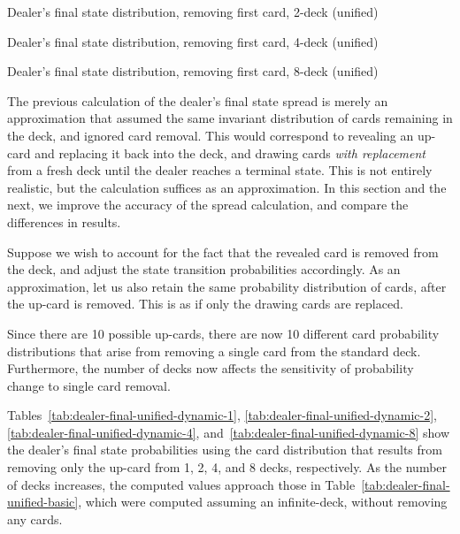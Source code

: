 \begin{table}[ht!]
\caption{Dealer's final state distribution, removing first card, 2-deck (unified)}
\begin{center}

\end{center}
\label{tab:dealer-final-unified-dynamic-2}
\end{table}

\begin{table}[ht!]
\caption{Dealer's final state distribution, removing first card, 4-deck (unified)}
\begin{center}

\end{center}
\label{tab:dealer-final-unified-dynamic-4}
\end{table}

\begin{table}[ht!]
\caption{Dealer's final state distribution, removing first card, 8-deck (unified)}
\begin{center}

\end{center}
\label{tab:dealer-final-unified-dynamic-8}
\end{table}

The previous calculation of the dealer's final state spread
is merely an approximation that assumed the same invariant distribution of 
cards remaining in the deck, and ignored card removal.  
This would correspond to revealing an up-card 
and replacing it back into the deck, 
and drawing cards \emph{with replacement} from a fresh deck until 
the dealer reaches a terminal state.
This is not entirely realistic, but the calculation suffices
as an approximation.
In this section and the next, we improve the accuracy of 
the spread calculation, and compare the differences in results.  

Suppose we wish to account for the fact that the revealed card
is removed from the deck, and adjust the state transition 
probabilities accordingly.  
As an approximation, let us also retain the same probability
distribution of cards, after the up-card is removed.
This is as if only the drawing cards are replaced.  

Since there are 10 possible up-cards, 
there are now 10 different card probability distributions
that arise from removing a single card from the standard deck.
Furthermore, the number of decks now affects the
sensitivity of probability change to single card removal.

Tables~\ref{tab:dealer-final-unified-dynamic-1},
\ref{tab:dealer-final-unified-dynamic-2},
\ref{tab:dealer-final-unified-dynamic-4},
and~\ref{tab:dealer-final-unified-dynamic-8}
show the dealer's final state probabilities using the
card distribution that results from removing only the up-card
from 1, 2, 4, and 8 decks, respectively.
As the number of decks increases, the computed values approach
those in Table~\ref{tab:dealer-final-unified-basic}, 
which were computed assuming an infinite-deck, 
without removing any cards.

